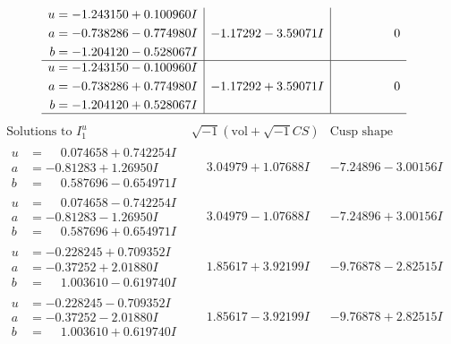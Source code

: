 \documentclass[1p]{elsarticle_modified}
\theoremstyle{definition}
\newcommand{\I}{\sqrt{-1}}
\begin{document}
$$\begin{array}{c|c|c}
\begin{aligned}
u &= -1.243150 + 0.100960 I \\
a &= -0.738286 - 0.774980 I \\
b &= -1.204120 - 0.528067 I\end{aligned}
 & -1.17292 - 3.59071 I & \phantom{-0.000000 } 0 \\ \hline\begin{aligned}
u &= -1.243150 - 0.100960 I \\
a &= -0.738286 + 0.774980 I \\
b &= -1.204120 + 0.528067 I\end{aligned}
 & -1.17292 + 3.59071 I & \phantom{-0.000000 } 0\\
 \hline 
 \end{array}$$\newpage$$\begin{array}{c|c|c}  
\text{Solutions to }I^u_{1}& \I (\text{vol} + \sqrt{-1}CS) & \text{Cusp shape}\\
 \hline 
\begin{aligned}
u &= \phantom{-}0.074658 + 0.742254 I \\
a &= -0.81283 + 1.26950 I \\
b &= \phantom{-}0.587696 - 0.654971 I\end{aligned}
 & \phantom{-}3.04979 + 1.07688 I & -7.24896 - 3.00156 I \\ \hline\begin{aligned}
u &= \phantom{-}0.074658 - 0.742254 I \\
a &= -0.81283 - 1.26950 I \\
b &= \phantom{-}0.587696 + 0.654971 I\end{aligned}
 & \phantom{-}3.04979 - 1.07688 I & -7.24896 + 3.00156 I \\ \hline\begin{aligned}
u &= -0.228245 + 0.709352 I \\
a &= -0.37252 + 2.01880 I \\
b &= \phantom{-}1.003610 - 0.619740 I\end{aligned}
 & \phantom{-}1.85617 + 3.92199 I & -9.76878 - 2.82515 I \\ \hline\begin{aligned}
u &= -0.228245 - 0.709352 I \\
a &= -0.37252 - 2.01880 I \\
b &= \phantom{-}1.003610 + 0.619740 I\end{aligned}
 & \phantom{-}1.85617 - 3.92199 I & -9.76878 + 2.82515 I \\ \hline\begin{aligned}

\end{aligned}
\end{array}$$
\end{document}
